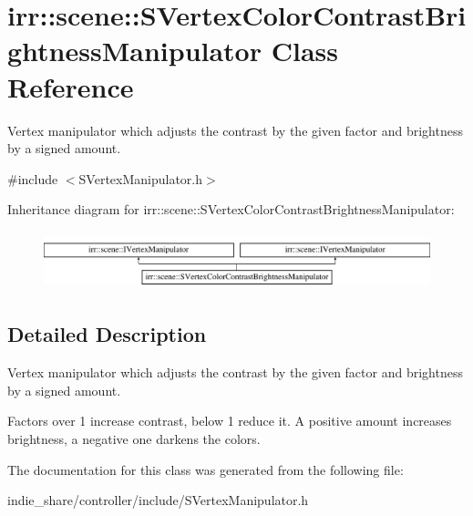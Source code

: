 \hypertarget{classirr_1_1scene_1_1SVertexColorContrastBrightnessManipulator}{}\section{irr\+:\+:scene\+:\+:S\+Vertex\+Color\+Contrast\+Brightness\+Manipulator Class Reference}
\label{classirr_1_1scene_1_1SVertexColorContrastBrightnessManipulator}


Vertex manipulator which adjusts the contrast by the given factor and brightness by a signed amount.  




{\ttfamily \#include $<$S\+Vertex\+Manipulator.\+h$>$}

Inheritance diagram for irr\+:\+:scene\+:\+:S\+Vertex\+Color\+Contrast\+Brightness\+Manipulator\+:\begin{figure}[H]
\begin{center}
\leavevmode
\includegraphics[height=1.707317cm]{classirr_1_1scene_1_1SVertexColorContrastBrightnessManipulator}
\end{center}
\end{figure}


\subsection{Detailed Description}
Vertex manipulator which adjusts the contrast by the given factor and brightness by a signed amount. 

Factors over 1 increase contrast, below 1 reduce it. A positive amount increases brightness, a negative one darkens the colors. 

The documentation for this class was generated from the following file\+:\begin{DoxyCompactItemize}
\item 
indie\+\_\+share/controller/include/S\+Vertex\+Manipulator.\+h\end{DoxyCompactItemize}
